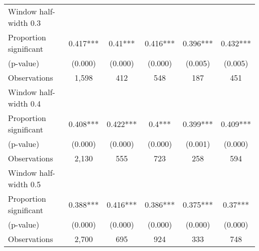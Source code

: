 \begin{tabular}{l*{5}{c}}
\hline
Window half-width 0.3\\

Proportion significant& 0.417*** &  0.41*** &  0.416*** &  0.396*** &  0.432***\\

(p-value) & (0.000) &  (0.000) &  (0.000) &  (0.005) &  (0.005)\\

Observations& 1,598 &  412 &  548 &  187 &  451\\

\hline
Window half-width 0.4\\

Proportion significant& 0.408*** &  0.422*** &  0.4*** &  0.399*** &  0.409***\\

(p-value) & (0.000) &  (0.000) &  (0.000) &  (0.001) &  (0.000)\\

Observations& 2,130 &  555 &  723 &  258 &  594\\

\hline
Window half-width 0.5\\

Proportion significant& 0.388*** &  0.416*** &  0.386*** &  0.375*** &  0.37***\\

(p-value) & (0.000) &  (0.000) &  (0.000) &  (0.000) &  (0.000)\\

Observations& 2,700 &  695 &  924 &  333 &  748\\

\hline\hline
\end{tabular}

